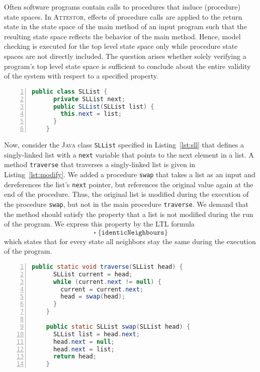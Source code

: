 \documentclass[a4paper, 12pt, twoside]{report}
\begin{document}
	Often software programs contain calls to procedures that induce (procedure) state spaces. In \textsc{Attestor}, effects of procedure calls are applied to the return state in the state space of the main method of an input program such that the resulting state space reflects the behavior of the main method. Hence, model checking is executed for the top level state space only while procedure state spaces are not directly included. The question arises whether solely verifying a program's top level state space is sufficient to conclude about the entire validity of the system with respect to a specified property.\\ 
	
	\begin{lstlisting}[language=Java,numbers=left,
	stepnumber=1,keywordstyle=\color{blue},frame=single,caption={\textsc{Java} class definition for singly-linked lists.},captionpos=b,label={lst:sll}]
	public class SLList {	
	  private SLList next;	  	
	  public SLList(SLList list) {	
	    this.next = list;
	  }
	}
	\end{lstlisting}	
	
	Now, consider the \textsc{Java} class \texttt{SLList} specified in Listing~\ref{lst:sll} that defines a singly-linked list with a \texttt{next} variable that points to the next element in a list. A method \texttt{traverse} that traverses a singly-linked list is given in Listing~\ref{lst:modify}. We added a procedure \texttt{swap} that takes a list as an input and dereferences the list's \texttt{next} pointer, but references the original value again at the end of the procedure. Thus, the original list is modified during the execution of the procedure \texttt{swap}, but not in the main procedure \texttt{traverse}. We demand that the method should satisfy the property that a list is not modified during the run of the program. We express this property by the LTL formula \[\square\;\{\texttt{identicNeighbours}\}\] which states that for every state all neighbors stay the same during the execution of the program.\\
	
	\begin{lstlisting}[language=Java,numbers=left,
	stepnumber=1,keywordstyle=\color{blue},frame=single,caption={\textsc{Java} code for traversing a singly-linked list that contains erroneous behaviour in a called procedure.},captionpos=b,label={lst:modify}]	  
	public static void traverse(SLList head) {	
	  SLList current = head;	
	  while (current.next != null) {
	    current = current.next;
	    head = swap(head);
	  }
	}
	
	public static SLList swap(SLList head) {	
	  SLList list = head.next;
	  head.next = null;
	  head.next = list;
	  return head;
	}	
	\end{lstlisting}
	
\end{document}
